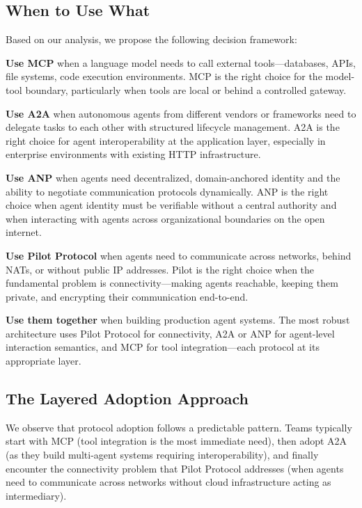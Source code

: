 \documentclass[11pt,a4paper]{article}
\begin{document}
\subsection{When to Use What}

Based on our analysis, we propose the following decision framework:

\textbf{Use MCP} when a language model needs to call external tools---databases, APIs, file systems, code execution environments. MCP is the right choice for the model-tool boundary, particularly when tools are local or behind a controlled gateway.

\textbf{Use A2A} when autonomous agents from different vendors or frameworks need to delegate tasks to each other with structured lifecycle management. A2A is the right choice for agent interoperability at the application layer, especially in enterprise environments with existing HTTP infrastructure.

\textbf{Use ANP} when agents need decentralized, domain-anchored identity and the ability to negotiate communication protocols dynamically. ANP is the right choice when agent identity must be verifiable without a central authority and when interacting with agents across organizational boundaries on the open internet.

\textbf{Use Pilot Protocol} when agents need to communicate across networks, behind NATs, or without public IP addresses. Pilot is the right choice when the fundamental problem is connectivity---making agents reachable, keeping them private, and encrypting their communication end-to-end.

\textbf{Use them together} when building production agent systems. The most robust architecture uses Pilot Protocol for connectivity, A2A or ANP for agent-level interaction semantics, and MCP for tool integration---each protocol at its appropriate layer.

\subsection{The Layered Adoption Approach}

We observe that protocol adoption follows a predictable pattern. Teams typically start with MCP (tool integration is the most immediate need), then adopt A2A (as they build multi-agent systems requiring interoperability), and finally encounter the connectivity problem that Pilot Protocol addresses (when agents need to communicate across networks without cloud infrastructure acting as intermediary).
\end{document}
